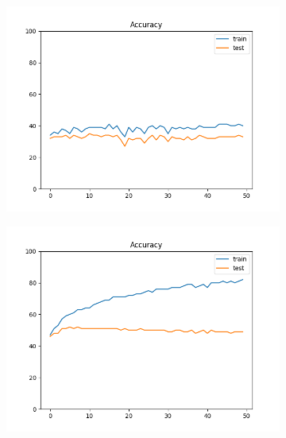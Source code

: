 \documentclass[12pt]{article}
\begin{document}
\begin{figure}
  \begin{subfigure}{0.16\textwidth}
    \centering
    \includegraphics[width=\linewidth]{accuracies_2_1.png}
  \end{subfigure}
  \begin{subfigure}{0.16\textwidth}
    \centering
    \includegraphics[width=\linewidth]{accuracies_2_2.png}
  \end{subfigure}
  \begin{subfigure}{0.16\textwidth}
    \centering

\end{subfigure}
\end{figure}
\end{document}

